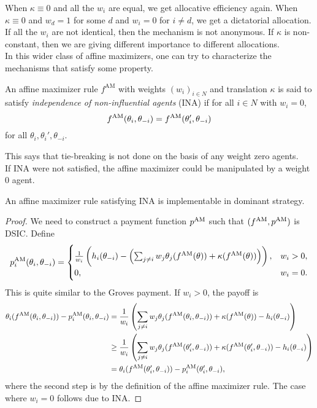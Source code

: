 		When $\kappa \equiv 0$ and all the $w_i$ are equal, we get allocative efficiency again. When $\kappa \equiv 0$ and $w_d = 1$ for some $d$ and $w_i = 0$ for $i \ne d$, we get a dictatorial allocation.\\
		If all the $w_i$ are not identical, then the mechanism is not anonymous. If $\kappa$ is non-constant, then we are giving different importance to different allocations.\\
		In this wider class of affine maximizers, one can try to characterize the mechanisms that satisfy some property.

		\begin{fdef}
			An affine maximizer rule $f^\text{AM}$ with weights $(w_i)_{i \in N}$ and translation $\kappa$ is said to satisfy \emph{independence of non-influential agents} (INA) if for all $i \in N$ with $w_i = 0$,
			\[ f^{\text{AM}}(\theta_i,\theta_{-i}) = f^{\text{AM}}(\theta_i',\theta_{-i}) \]
			for all $\theta_i,\theta_i',\theta_{-i}$. 
		\end{fdef}
		This says that tie-breaking is not done on the basis of any weight zero agents.\\
		If INA were not satisfied, the affine maximizer could be manipulated by a weight $0$ agent.

		\begin{ftheo}
			An affine maximizer rule satisfying INA is implementable in dominant strategy.
		\end{ftheo}
		\begin{proof}
			We need to construct a payment function $p^{\text{AM}}$ such that $(f^{\text{AM}},p^{\text{AM}})$ is DSIC. Define
			\[ p_i^{\text{AM}}(\theta_i,\theta_{-i}) = \begin{cases} \frac{1}{w_i} \left( h_i(\theta_{-i}) - \left( \sum_{j \ne i} w_j \theta_j(f^{\text{AM}}(\theta)) + \kappa(f^{\text{AM}}(\theta)) \right) \right), & w_i > 0, \\ 0, & w_i = 0. \end{cases} \]
			This is quite similar to the Groves payment.
			If $w_i > 0$, the payoff is
			\begin{align*}
				\theta_i(f^{\text{AM}}(\theta_i,\theta_{-i})) - p_i^{\text{AM}}(\theta_i,\theta_{-i}) &= \frac{1}{w_i} \left( \sum_{j \ne i} w_j \theta_j(f^{\text{AM}}(\theta_i,\theta_{-i})) + \kappa(f^{\text{AM}}(\theta)) - h_i(\theta_{-i}) \right) \\
					&\ge \frac{1}{w_i} \left( \sum_{j \ne i} w_j \theta_j(f^{\text{AM}}(\theta_i',\theta_{-i})) + \kappa(f^{\text{AM}}(\theta_i',\theta_{-i})) - h_i(\theta_{-i}) \right) \\
					&= \theta_i(f^{\text{AM}}(\theta_i',\theta_{-i})) - p_i^{\text{AM}}(\theta_i',\theta_{-i}),
			\end{align*}
			where the second step is by the definition of the affine maximizer rule. The case where $w_i = 0$ follows due to INA.
		\end{proof}

